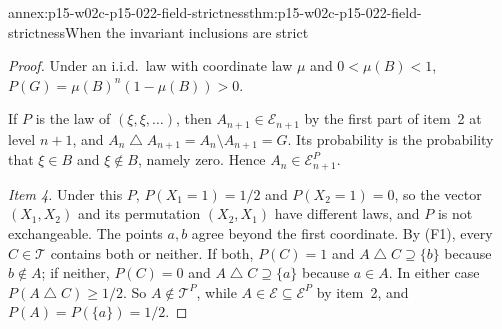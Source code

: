 \begin{annexitem}{annex:p15-w02c-p15-022-field-strictness}{thm:p15-w02c-p15-022-field-strictness}{When the invariant inclusions are strict}
\begin{proof}
Under an i.i.d.\ law with coordinate law \(\mu\) and
\(0<\mu(B)<1\), \(P(G)=\mu(B)^n(1-\mu(B))>0\).

If \(P\) is the law of \((\xi,\xi,\ldots)\), then \(A_{n+1}\in\mathcal
E_{n+1}\) by the first part of item~2 at level \(n+1\), and
\(A_n\mathbin{\triangle}A_{n+1}=A_n\setminus A_{n+1}=G\). Its probability
is the probability that \(\xi\in B\) and \(\xi\notin B\), namely zero.
Hence \(A_n\in\mathcal E_{n+1}^{P}\).

\emph{Item 4.} Under this \(P\), \(P(X_1=1)=1/2\) and \(P(X_2=1)=0\), so
the vector \((X_1,X_2)\) and its permutation \((X_2,X_1)\) have different
laws, and \(P\) is not exchangeable. The points \(a,b\) agree beyond the
first coordinate. By (F1), every \(C\in\mathcal T\) contains both or
neither. If both, \(P(C)=1\) and \(A\mathbin{\triangle}C\supseteq\{b\}\)
because \(b\notin A\); if neither, \(P(C)=0\) and
\(A\mathbin{\triangle}C\supseteq\{a\}\) because \(a\in A\). In either case
\(P(A\mathbin{\triangle}C)\geq1/2\). So \(A\notin\mathcal T^{P}\), while
\(A\in\mathcal E\subseteq\mathcal E^{P}\) by item~2, and
\(P(A)=P(\{a\})=1/2\).
\end{proof}
\end{annexitem}

